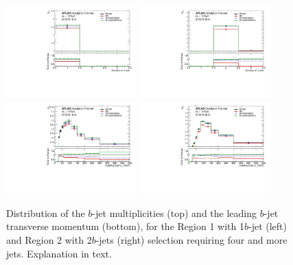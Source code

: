 \begin{figure}[!htb]
\centering
\includegraphics[width=0.45\textwidth]{Plots/ttV/generator/c_Region_0_nBtagJets}
\includegraphics[width=0.45\textwidth]{Plots/ttV/generator/c_Region_1_nBtagJets}\\
\includegraphics[width=0.45\textwidth]{Plots/ttV/generator/c_Region_0_Bjet_Pt_0}
\includegraphics[width=0.45\textwidth]{Plots/ttV/generator/c_Region_1_Bjet_Pt_0}\\
  \caption{Distribution of the $b$-jet multiplicities (top) and the leading $b$-jet transverse momentum (bottom), for the Region 1 with 1$b$-jet (left) and Region 2 with 2$b$-jets (right) selection requiring four and more jets. Explanation in text. \label{ttV:den_4jbinfo}}
\end{figure}



